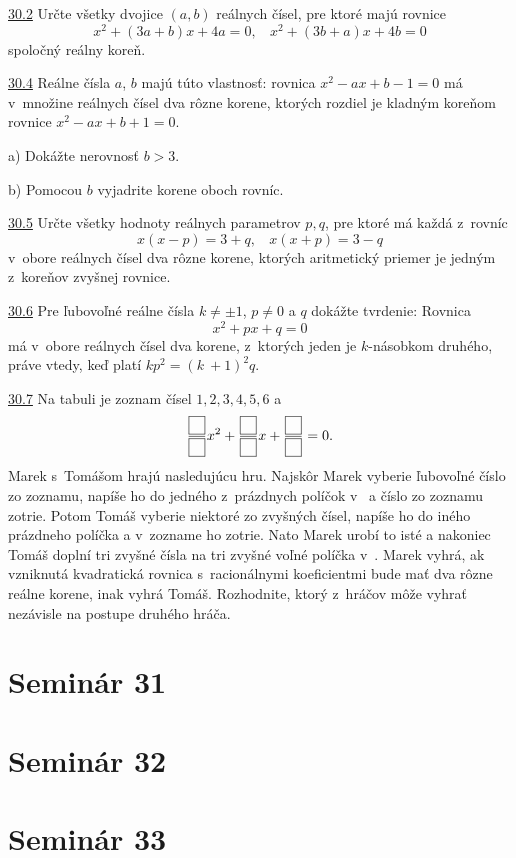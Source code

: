\noindent \ul{30.2} 
Určte všetky dvojice $(a, b)$ reálnych čísel, pre ktoré majú rovnice
$$x^2 + (3a + b)x + 4a = 0, \ \ \ \  x^2 + (3b + a)x + 4b = 0$$
spoločný reálny koreň.




\noindent \ul{30.4} Reálne čísla $a$, $b$ majú túto vlastnosť: rovnica $x^2 -ax+b-1 = 0$ má v~množine reálnych čísel dva rôzne korene, ktorých rozdiel je kladným koreňom rovnice $x^2 - ax + b + 1 = 0$.

a) Dokážte nerovnosť $b > 3$.

b) Pomocou $b$ vyjadrite korene oboch rovníc.




\noindent \ul{30.5} Určte všetky hodnoty reálnych parametrov $p, q$, pre ktoré má každá z~rovníc
$$x(x - p) = 3 + q, \ \ \ \ x(x + p) = 3 - q$$
v~obore reálnych čísel dva rôzne korene, ktorých aritmetický priemer je jedným z~koreňov
zvyšnej rovnice.




\noindent \ul{30.6}  Pre ľubovoľné reálne čísla $k\neq \pm 1$, $p \neq 0$ a $q$ dokážte tvrdenie: Rovnica
$$x^2+ px + q = 0$$
má v~obore reálnych čísel dva korene, z~ktorých jeden je $k$-násobkom druhého, práve vtedy, keď platí $kp^2 = (k~+ 1)^2 q$.




\noindent \ul{30.7}   Na tabuli je zoznam čísel $1, 2, 3, 4, 5, 6$ a 
$$\frac{\fbox{$\phantom{7}$}}{\fbox{$\phantom{7}$}}x^2+\frac{\fbox{$\phantom{7}$}}{\fbox{$\phantom{7}$}}x + \frac{\fbox{$\phantom{7}$}}{\fbox{$\phantom{7}$}}= 0.$$
Marek s~Tomášom hrajú nasledujúcu hru. Najskôr Marek vyberie ľubovoľné číslo zo zoznamu, napíše ho do jedného z~prázdnych políčok v~ a číslo zo zoznamu zotrie. Potom Tomáš vyberie niektoré zo zvyšných čísel, napíše ho do iného prázdneho políčka a v~zozname ho zotrie. Nato Marek urobí to isté a nakoniec Tomáš doplní tri zvyšné čísla na tri zvyšné voľné políčka v~. Marek vyhrá, ak vzniknutá kvadratická rovnica s~racionálnymi koeficientmi bude mať dva rôzne reálne korene, inak vyhrá Tomáš. Rozhodnite, ktorý z~hráčov môže vyhrať nezávisle na postupe druhého
hráča.




\section*{Seminár 31}

\section*{Seminár 32}

\section*{Seminár 33}

